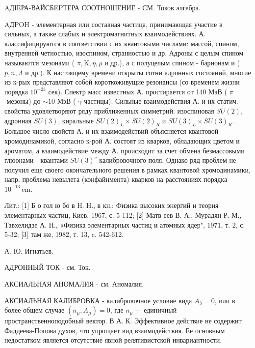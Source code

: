 \documentclass[10pt]{article}
\begin{document}
AДIЕРА-ВАЙСБEPТЕРА СООТНОШЕНИЕ - СМ. Токов алгебра.



AДPOH - элементарная или составная частица, принимающая участие в сильных, а также слабых и электромагнитных взаимодействиях. А. классифицируются в соответствии с их квантовыми числами: массой, спином, внутренней четностью, изоспином, странностью и др. Адроны с целым спином называются мезонами ( $\pi, \mathrm{K}, \eta, \rho$ и др.), а с полуцелым спином - барионам и ( $p, n, \Lambda$ и др.). К настоящему времени открыты сотни адронных состояний, многие из к-рых представляют собой короткоживущие резонансы (со временем жизни порядка $10^{-23}$ сек). Спектр масс известных А. простирается от 140 МэВ ( $\pi$-мезоны) до $\sim 10$ МэВ ( $\gamma$-частицы). Сильные взаимодействия А. и их статич. свойства удовлетворяют ряду приближенных симметрий: изоспиновая $S U(2)$, адронная $S U(3)$, киральные $S U(2)_{L} \times S U(2)_{R}$ и $S U(3)_{L} \times S U(3)_{R}$. Большое число свойств А. и их взаимодействий объясняется квантовой хромодинамикой, согласно к-рой А. состоят из кварков, обладающих цветом и ароматом, а взаимодействие между А. происходит за счет обмена безмассовыми глюонами - квантами $S U(3)^{c}$ калибровочного поля. Однако ряд проблем не получил еще своего окончательного решения в рамках квантовой хромодинамики, напр. проблема невылета (конфайнмента) кварков на расстояниях порядка $10^{-13} \mathrm{~cm}$.



Лит.: [1] Б о гол ю бо в Н. Н., в кн.: Физика высоких энергий и теория элементарных частиц, Киев, 1967, с. 5-112; [2] Матв еев В. А., Мурадян Р. М., Тавхелидзе А. Н., «Физика элементарных частиц и атомных ядер", 1971, т. 2, с. 5-32; [3] там же, 1982, т. 13, c. 542-612.



А. Ю. Игнатьев.



АДРОННЫЙ ТОК - см. Ток.



АКСИАЛЬНАЯ АНОМАЛИЯ - см. Аномалия.



АКСИАЛЬНАЯ КАЛИБРОВКА - калибровочное условие вида $A_{3}=0$, или в более общем случае $\left(n_{\mu}, A_{\mu}\right)=0$, где $n_{\mu}-$ единичный пространственноподобный вектор. В А. К. Эффективное действие не содержит Фаддеева-Попова духов, что упрощает вид взаимодействия. Ее основным недостатком является отсутствие явной релятивистской инвариантности.
\end{document}
